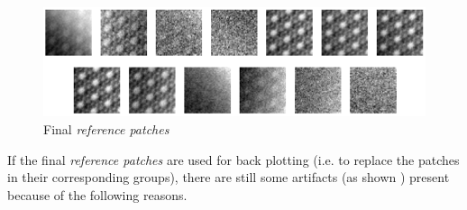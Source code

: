 \documentclass[fleqn,10pt]{wlscirep}
\begin{document}
	
	\begin{figure}
		\centering
		\includegraphics[scale=0.8]{./imgs/final_reference_patches.png}
		\caption{Final \textit{reference patches}}
		\label{fig:final_reference_patches}
	\end{figure} 
	
	If the final \textit{reference patches} are used for back plotting (i.e. to replace the patches in their corresponding groups), there are still some artifacts (as shown ) present because of the following reasons. 
	
	
\end{document}
